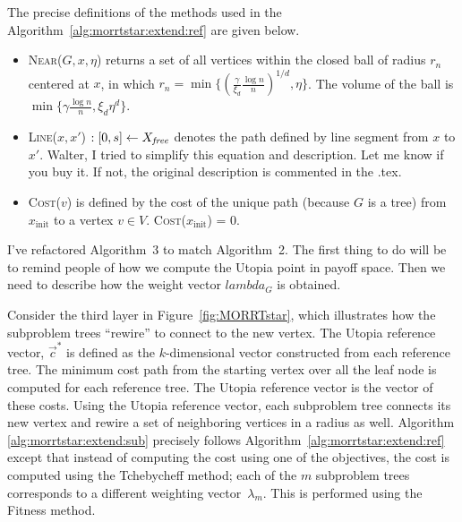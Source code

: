 \documentclass[conference]{IEEEtran}
\begin{document}
The precise definitions of the methods used in the Algorithm~\ref{alg:morrtstar:extend:ref} are given below.
\begin{itemize}
	\item \textsc{Near}($ G, x, \eta $) returns a set of all vertices within the closed ball of radius $ r_{n} $ centered at $ x $, in which $ r_{n} = \min \{ ( \frac{\gamma}{\xi_{d}} \frac{\log n}{n} )^{1/d}  , \eta \} $.
	The volume of the ball is $ \min \{ \gamma \frac{\log n}{n} , \xi_{d} \eta^{d} \} $.

	\item \textsc{Line}($ x, x' $) $ : [0, s] \leftarrow X_{\it free} $ denotes the path defined by line segment from $x$ to $x'$.
	{\sc Walter, I tried to simplify this equation and description.  Let me know if you buy it.  If not, the original description is commented in the .tex.}
	
	\item \textsc{Cost}($ v  $) is defined by the cost of the unique path (because $G$ is a tree) from $ x_{ \mbox{init} } $ to a vertex $ v \in V $. \textsc{Cost}($ x_{ \mbox{init} } $) = $ 0 $.
\end{itemize}

{\sc I've refactored Algorithm~3 to match Algorithm~2. The first thing to do will be to remind people of how we compute the Utopia point in payoff space.  Then we need to describe how the weight vector $lambda_G$ is obtained.}

Consider the third layer in Figure~\ref{fig:MORRTstar}, which illustrates how the subproblem trees ``rewire'' to connect to the new vertex.  
The Utopia reference vector, $\vec{c}^*$ is defined as the $k$-dimensional vector constructed from each reference tree.  
The minimum cost path from the starting vertex over all the leaf node is  computed for each reference tree.  
The Utopia reference vector is the vector of these costs. 
Using the Utopia reference vector, each subproblem tree connects its new vertex and rewire a set of neighboring vertices in a radius as well. 
Algorithm \ref{alg:morrtstar:extend:sub} precisely follows Algorithm~\ref{alg:morrtstar:extend:ref} except that instead of computing the cost using one of the objectives, the cost is computed using the Tchebycheff method; each of the $m$ subproblem trees corresponds to a different weighting vector~$\lambda_m$.  
This is performed using the {\sc Fitness} method.
\end{document}
